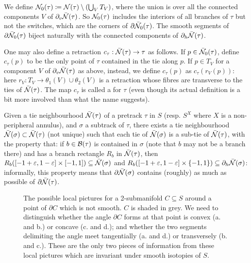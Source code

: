 We define ${\mathcal N}_0(\tau)\coloneqq {\mathcal N}(\tau)\setminus\left(\bigcup_V T_V\right)$, where the union is over all the connected components $V$ of $\partial_v\bar{{\mathcal N}}(\tau)$. So ${\mathcal N}_0(\tau)$ includes the interiors of all branches of $\tau$ but not the switches, which are the corners of $\partial\bar{{\mathcal N}}_0(\tau)$. The smooth segments of $\partial\bar{{\mathcal N}}_0(\tau)$ biject naturally with the connected components of $\partial_h\bar{{\mathcal N}}(\tau)$.

One may also define a retraction $c_\tau:\bar{{\mathcal N}}(\tau)\rightarrow \tau$ as follows. If $p\in \bar{{\mathcal N}}_0(\tau)$, define $c_\tau(p)$ to be the only point of $\tau$ contained in the tie along $p$. If $p\in T_V$ for a component $V$ of $\partial_v\bar{{\mathcal N}}(\tau)$ as above, instead, we define $c_\tau(p)$ as $c_\tau(r_V(p))$: here $r_V: T_V\rightarrow \theta_1(V)\cup\theta_2(V)$ is a retraction whose fibres are transverse to the ties of $\bar{{\mathcal N}}(\tau)$. The map $c_\tau$ is called a  for $\tau$ (even though its actual definition is a bit more involved than what the name suggests).

Given a tie neighbourhood $\bar{{\mathcal N}}(\tau)$ of a pretrack $\tau$ in $S$ (resp. $S^X$ where $X$ is a non-peripheral annulus), and $\sigma$ a subtrack of $\tau$, there exists a tie neighbourhood $\bar{{\mathcal N}}(\sigma)\subset \bar{{\mathcal N}}(\tau)$ (not unique) such that each tie of $\bar{{\mathcal N}}(\sigma)$ is a sub-tie of $\bar{{\mathcal N}}(\tau)$, with the property that: if $b\in\mathcal B(\tau)$ is contained in $\sigma$ (note that $b$ may not be a branch there) and has a branch rectangle $R_b$ in $\bar{{\mathcal N}}(\tau)$, then $R_b([-1+\varepsilon ,1-\varepsilon]\times[-1,1])\subseteq \bar{{\mathcal N}}(\sigma)$ and $R_b([-1+\varepsilon,1-\varepsilon]\times\{-1,1\})\subseteq \partial_h\bar{{\mathcal N}}(\sigma)$: informally, this property means that $\partial \bar{{\mathcal N}}(\sigma)$ contains (roughly) as much as possible of $\partial\bar{{\mathcal N}}(\tau)$.

\begin{figure}
\def\svgwidth{.65\textwidth}
\begin{center}

\end{center}
\caption{\label{fig:cornertypes} The possible local pictures for a 2-submanifold $C\subseteq S$ around a point of $\partial C$ which is not smooth. $C$ is shaded in grey. We need to distinguish whether the angle $\partial C$ forms at that point is convex (a. and b.) or concave (c. and d.); and whether the two segments delimiting the angle meet tangentially (a. and d.) or transversely (b. and c.). These are the only two pieces of information from these local pictures which are invariant under smooth isotopies of $S$.}
\end{figure}

